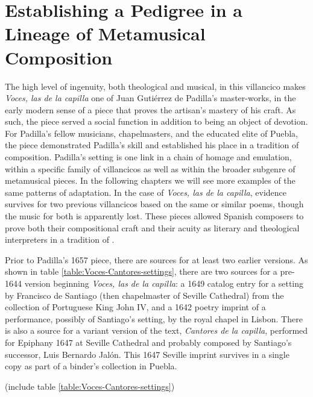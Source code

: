 \section{Establishing a Pedigree in a Lineage of Metamusical Composition}

The high level of ingenuity, both theological and musical, in this villancico
makes \emph{Voces, las de la capilla} one of Juan Gutiérrez de Padilla's
master-works, in the early modern sense of a piece that proves the artisan's
mastery of his craft.
As such, the piece served a social function in addition to being an object of
devotion.
For Padilla's fellow musicians, chapelmasters, and the educated elite of Puebla,
the piece demonstrated Padilla's skill and established his place in a tradition
of composition.
Padilla's setting is one link in a chain of homage and emulation, within a
specific family of villancicos as well as within the broader subgenre of
metamusical pieces.
In the following chapters we will see more examples of the same patterns of
adaptation.
In the case of \emph{Voces, las de la capilla}, evidence survives for two previous
villancicos based on the same or similar poems, though the music for both is
apparently lost.
These pieces allowed Spanish composers to prove both their compositional craft
and their acuity as literary and theological interpreters in a tradition of
.

Prior to Padilla's 1657 piece, there are sources for at least two earlier
versions. 
As shown in table \ref{table:Voces-Cantores-settings}, there are two
sources for a pre-1644 version beginning \emph{Voces, las de la capilla}: a 1649
catalog entry for a setting by Francisco de Santiago (then chapelmaster of
Seville Cathedral) from the collection of Portuguese King John IV, and a
1642 poetry imprint of a performance, possibly of Santiago's setting, by the
royal chapel in Lisbon.
There is also a source for a variant version of the text, \emph{Cantores de la
capilla}, performed for Epiphany 1647 at Seville Cathedral and probably composed
by Santiago's successor, Luis Bernardo Jalón.
This 1647 Seville imprint survives in a single copy as part of a binder's
collection in Puebla.

(include table \ref{table:Voces-Cantores-settings})
\label{table:Voces-Cantores-settings}

